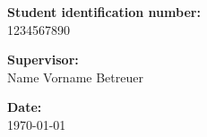 \documentclass[11pt,a4paper,oneside]{scrbook}
\begin{document}
\begin{titlepage}
\begin{center}
            \textbf{Student identification number:} \\
            1234567890
            \vspace{0.7cm}

            \textbf{Supervisor:} \\
            Name Vorname Betreuer
            \vspace{0.7cm}

            \textbf{Date:} \\
            \today
        \end{center}
    \end{titlepage}

    
    

    \newpage\noindent
    

    \tableofcontents
    \newpage
    
    
    


    

    \newpage
    
    \newpage

    \newpage
    \listoffigures

    \newpage
    \listoftables

    \backmatter

    
\end{document}
